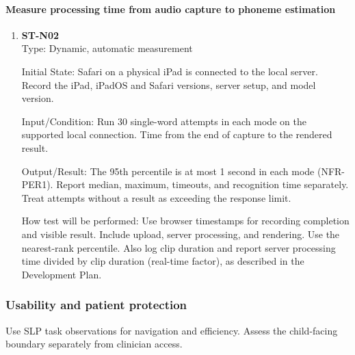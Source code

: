 \documentclass[12pt, titlepage]{article}
\newcommand{\WordLatencyLimit}{1 second}
\newcommand{\WordLatencyPercentile}{95th percentile}
\newcommand{\WordLatencyRuns}{30}
\begin{document}
\paragraph{Measure processing time from audio capture to phoneme estimation}
\begin{enumerate}
    \item \textbf{ST-N02}\\

    Type: Dynamic, automatic measurement

    Initial State: Safari on a physical iPad is connected to the local server. Record the iPad, iPadOS and Safari versions, server setup, and model version.

    Input/Condition: Run \WordLatencyRuns{} single-word attempts in each mode on the supported local connection. Time from the end of capture to the rendered result.

    Output/Result: The \WordLatencyPercentile{} is at most \WordLatencyLimit{} in each mode (NFR-PER1). Report median, maximum, timeouts, and recognition time separately. Treat attempts without a result as exceeding the response limit.

    How test will be performed: Use browser timestamps for recording completion and visible result. Include upload, server processing, and rendering. Use the nearest-rank percentile. Also log clip duration and report server processing time divided by clip duration (real-time factor), as described in the Development Plan.

\end{enumerate}

\subsubsection{Usability and patient protection}

Use SLP task observations for navigation and efficiency. Assess the child-facing boundary
separately from clinician access.
\end{document}
